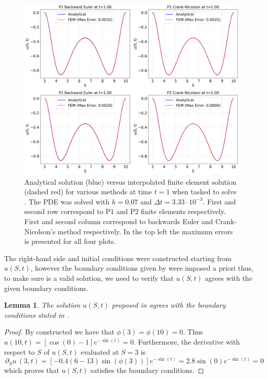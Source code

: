\documentclass{article}
\newtheorem{lemma}[thm]{Lemma}
\newcommand{\darg}[2]{\ensuremath{\, \partial_{#2}#1} \, }
\newcommand{\dS}[1]{\ensuremath{\darg{#1}{S}}}
\newcommand{\dSu}{\dS{u}}
\begin{document}
\begin{figure}[!ht]
    \centering
    \includegraphics[width=0.95\linewidth]{code/images/fem_vs_analytical_BlackScholesConstructedCos.png}
    \caption{Analytical solution (blue) versus interpolated finite element solution (dashed red) for various methods at time $t=1$ when tasked to solve . The PDE was solved with $h =0.07$ and $\Delta t = 3.33 \cdot 10^{-3} $. First and second row correspond to P1 and P2 finite elements respectively. First and second column correspond to backwards Euler and Crank-Nicolson's method respectively. In the top left the maximum errors is presented for all four plots.}
    \label{fig:fem_vs_true_cos}
\end{figure}

The right-hand side and initial conditions were constructed starting from $u(S,t)$, however the boundary conditions given by  were imposed a priori thus, to make sure  is a valid solution, we need to verify that $u(S,t)$ agrees with the given boundary conditions.
\begin{lemma}
    The solution $u(S,t)$ proposed in  agrees with the boundary conditions stated in .
\end{lemma}
\begin{proof}
    By constructed we have that $\phi(3)=\phi(10)=0$. Thus $u(10,t)=\left[\cos\left(0\right)-1\right]e^{-\sin(t)} = 0$. Furthermore, the derivative with respect to $S$ of $u(S,t)$ evaluated at $S = 3$ is
    \begin{equation*}
        \dSu(3, t) = \left[-0.4 (6 - 13) \sin(\phi(3))\right]e^{-\sin (t)} = 2.8 \sin(0)e^{-\sin (t)} = 0
    \end{equation*}
    which proves that $u(S,t)$ satisfies the boundary conditions.
\end{proof}
\end{document}
